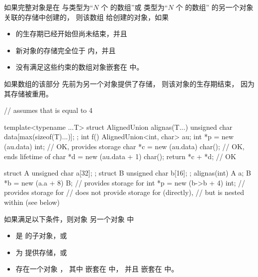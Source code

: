 \pnum
{}%
如果完整对象是在
与类型为“$N$ 个  的数组”或
类型为“$N$ 个  的数组” 的另一个对象 
关联的存储中创建的，
则该数组 
给创建的对象，如果
\begin{itemize}
\item
{} 的生存期已经开始但尚未结束，并且
\item
新对象的存储完全位于  内，并且
\item
没有满足这些约束的数组对象嵌套在  中。
\end{itemize}
\begin{note}
如果数组的该部分
先前为另一个对象提供了存储，
则该对象的生存期结束，
因为其存储被重用。
\end{note}
\begin{example}
\begin{codeblock}
// assumes that  is equal to 4

template<typename ...T>
struct AlignedUnion {
  alignas(T...) unsigned char data[max(sizeof(T)...)];
};
int f() {
  AlignedUnion<int, char> au;
  int *p = new (au.data) int;           // OK,  provides storage
  char *c = new (au.data) char();       // OK, ends lifetime of 
  char *d = new (au.data + 1) char();
  return *c + *d;                       // OK
}

struct A { unsigned char a[32]; };
struct B { unsigned char b[16]; };
alignas(int) A a;
B *b = new (a.a + 8) B;                 //  provides storage for 
int *p = new (b->b + 4) int;            //  provides storage for 
                                        //  does not provide storage for  (directly),
                                        // but  is nested within  (see below)
\end{codeblock}
\end{example}

\pnum
{}%
如果满足以下条件，则对象   另一个对象  中
\begin{itemize}
\item
{} 是  的子对象，或
\item
{} 为  提供存储，或
\item
存在一个对象 ，
其中  嵌套在  中，
并且  嵌套在  中。
\end{itemize}

